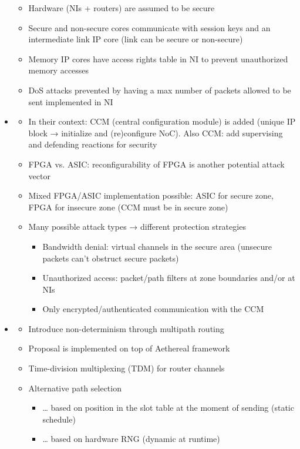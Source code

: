 \begin{itemize}
\begin{itemize}
            \item Hardware (NIs + routers) are assumed to be secure
            \item Secure and non-secure cores communicate with session keys and an intermediate link IP core (link can be secure or non-secure)
            \item Memory IP cores have access rights table in NI to prevent unauthorized memory accesses
            \item DoS attacks prevented by having a max number of packets allowed to be sent implemented in NI
        \end{itemize}
    \item \textbf{}
        \begin{itemize}
            \item In their context: CCM (central configuration module) is added (unique IP block → initialize and (re)configure NoC). Also CCM:
                add supervising and defending reactions for security
            \item FPGA vs. ASIC: reconfigurability of FPGA is another potential attack vector
            \item Mixed FPGA/ASIC implementation possible: ASIC for secure zone, FPGA for insecure zone (CCM must be in secure zone)
            \item Many possible attack types → different protection strategies
                \begin{itemize}
                    \item Bandwidth denial: virtual channels in the secure area (unsecure packets can't obstruct secure packets)
                    \item Unauthorized access: packet/path filters at zone boundaries and/or at NIs
                    \item Only encrypted/authenticated communication with the CCM
                \end{itemize}
        \end{itemize}
    \item \textbf{}
        \begin{itemize}
            \item Introduce non-determinism through multipath routing
            \item Proposal is implemented on top of Aethereal framework
            \item Time-division multiplexing (TDM) for router channels
            \item Alternative path selection
                \begin{itemize}
                    \item … based on position in the slot table at the moment of sending (static schedule)
                    \item … based on hardware RNG (dynamic at runtime)
                \end{itemize}
        \end{itemize}
\end{itemize}

